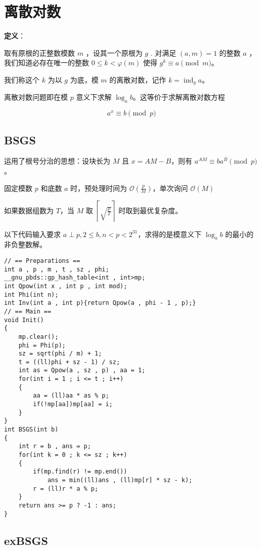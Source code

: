 \section{离散对数}

\begin{tcolorbox}
\textbf{定义}：

取有原根的正整数模数 $m$ ，设其一个原根为 $g$ . 对满足 $(a,m)=1$ 的整数 $a$ ，我们知道必存在唯一的整数 $0\leq k<\varphi(m)$ 使得 $ g^k\equiv a\pmod m $。

我们称这个 $k$ 为以 $g$ 为底，模 $m$ 的离散对数，记作 $k=\operatorname{ind}_g a$。
\end{tcolorbox}

离散对数问题即在模 $p$ 意义下求解 $\log_{a}{b}$。这等价于求解离散对数方程

$$a^x \equiv b\pmod p$$

\subsection{BSGS}

运用了根号分治的思想：设块长为 $M$ 且 $x=AM-B$，则有 $a^{AM} \equiv ba^{B} \pmod p$。

固定模数 $p$ 和底数 $a$ 时，预处理时间为 $\mathcal{O}(\frac{p}{M})$，单次询问 $\mathcal{O}(M)$

如果数据组数为 $T$，当 $M$ 取 $\left \lceil \sqrt{\frac{p}{T}} \right \rceil$ 时取到最优复杂度。

以下代码输入要求 $a \perp p,2\le b,n < p<2^{31}$，求得的是模意义下 $\log_{a}{b}$ 的最小的非负整数解。

\begin{verbatim}
// == Preparations ==
int a , p , m , t , sz , phi; 
__gnu_pbds::gp_hash_table<int , int>mp;
int Qpow(int x , int p , int mod);
int Phi(int n);
int Inv(int a , int p){return Qpow(a , phi - 1 , p);}
// == Main ==
void Init()
{
    mp.clear();
    phi = Phi(p); 
    sz = sqrt(phi / m) + 1;
    t = ((ll)phi + sz - 1) / sz;
    int as = Qpow(a , sz , p) , aa = 1;
    for(int i = 1 ; i <= t ; i++)
    {
        aa = (ll)aa * as % p;
        if(!mp[aa])mp[aa] = i;
    }
}
int BSGS(int b)
{
    int r = b , ans = p;
    for(int k = 0 ; k <= sz ; k++)
    {
        if(mp.find(r) != mp.end())
            ans = min((ll)ans , (ll)mp[r] * sz - k);
        r = (ll)r * a % p;
    }
    return ans >= p ? -1 : ans;
}
\end{verbatim}

\subsection{exBSGS}

